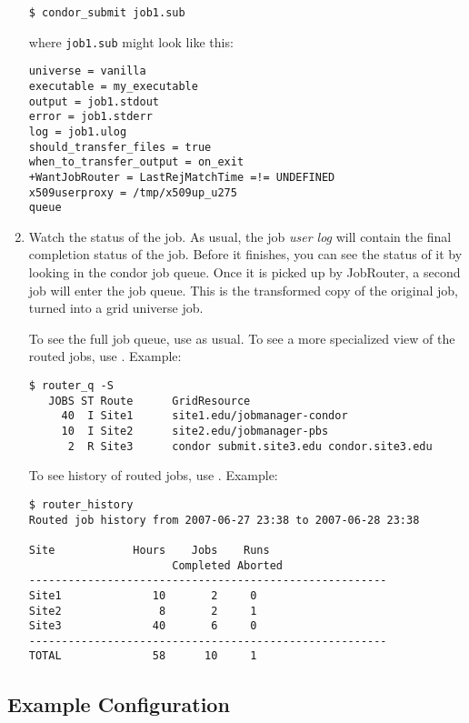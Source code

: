 \begin{enumerate}
\begin{verbatim}
$ condor_submit job1.sub
\end{verbatim}

where \verb|job1.sub| might look like this:

\begin{verbatim}
universe = vanilla
executable = my_executable
output = job1.stdout
error = job1.stderr
log = job1.ulog
should_transfer_files = true
when_to_transfer_output = on_exit
+WantJobRouter = LastRejMatchTime =!= UNDEFINED
x509userproxy = /tmp/x509up_u275
queue
\end{verbatim}

\item Watch the status of the job.  As usual, the job \textit{user log} will
contain the final completion status of the job.  Before it finishes,
you can see the status of it by looking in the condor job queue.  Once
it is picked up by JobRouter, a second job will enter the job queue.
This is the transformed copy of the original job, turned into a grid
universe job.

To see the full job queue, use  as usual.  To
see a more specialized view of the routed jobs, use
.  Example:

\begin{verbatim}
$ router_q -S
   JOBS ST Route      GridResource
     40  I Site1      site1.edu/jobmanager-condor
     10  I Site2      site2.edu/jobmanager-pbs
      2  R Site3      condor submit.site3.edu condor.site3.edu
\end{verbatim}

To see history of routed jobs, use .  Example:

\begin{verbatim}
$ router_history
Routed job history from 2007-06-27 23:38 to 2007-06-28 23:38

Site            Hours    Jobs    Runs
                      Completed Aborted
-------------------------------------------------------
Site1              10       2     0
Site2               8       2     1
Site3              40       6     0
-------------------------------------------------------
TOTAL              58      10     1
\end{verbatim}

\end{enumerate}


\subsection{Example Configuration}\label{ExampleJobRouterConfiguration}

